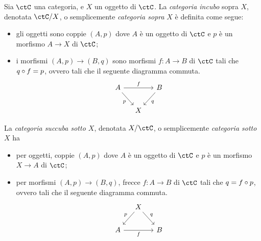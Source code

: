 \begin{definition}\label{def_cat_slice}
	Sia \(\ctC\) una categoria, e \(X\) un oggetto di \(\ctC\).
	La \emph{categoria incubo} sopra \(X\), denotata \(\ctC/X\), o semplicemente \emph{categoria sopra} \(X\) è definita come segue:%
	\begin{itemize}
		\item gli oggetti sono coppie \((A,p)\) dove \(A\) è un oggetto di \(\ctC\) e \(p\) è un morfismo \(A\to X\) di \(\ctC\);
		\item i morfismi \((A,p)\to(B,q)\) sono morfismi \(f:A\to B\) di \(\ctC\) tali che \(q\circ f=p\), ovvero tali che il seguente diagramma commuta.
		      \[
			      \begin{tikzcd}[column sep=small]
				      A \ar{rr}{f} \ar{dr}[swap]{p} && B \ar{dl}{q} \\
				      & X
			      \end{tikzcd}
		      \]
	\end{itemize}

	La \emph{categoria succuba sotto \(X\)}, denotata \(X/\ctC\), o semplicemente \emph{categoria sotto} \(X\) ha
	\begin{itemize}
		\item per oggetti, coppie \((A,p)\) dove \(A\) è un oggetto di \(\ctC\) e \(p\) è un morfismo \(X\to A\) di \(\ctC\);
		\item per morfismi \((A,p)\to(B,q)\), frecce \(f:A\to B\) di \(\ctC\) tali che \(q=f\circ p\), ovvero tali che il seguente diagramma commuta.
		      \[
			      \begin{tikzcd}[column sep=small]
				      & X \ar{dl}[swap]{p} \ar{dr}{q}  \\
				      A \ar{rr}[swap]{f} && B
			      \end{tikzcd}
		      \]
	\end{itemize}
\end{definition}

